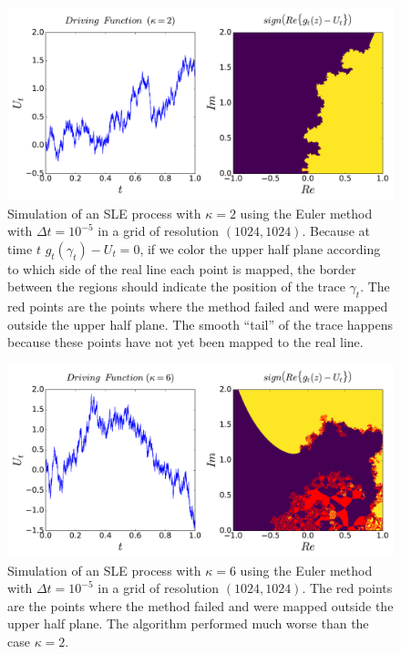 \begin{figure}
\begin{center}
    \includegraphics[scale=0.45]{chapters/ch4-sle/figs/euler1}
\end{center}
\caption{Simulation of an SLE process with $\kappa=2$ using the Euler method
    with $\Delta t = 10^{-5}$ in a grid of resolution $(1024, 1024)$. Because
    at time $t$ $g_t(\gamma_t)-U_t=0$, if we color the upper half plane
    according to which side of the real line each point is mapped, the border
    between the regions should indicate the position of the trace $\gamma_t$.
    The red points are the points where the method failed and were mapped
    outside the upper half plane. The smooth ``tail'' of the trace happens
    because these points have not yet been mapped to the real line.}
\label{fig:euler1}
\end{figure}

\begin{figure}
\begin{center}
    \includegraphics[scale=0.45]{chapters/ch4-sle/figs/euler2}
\end{center}
\caption{Simulation of an SLE process with $\kappa=6$ using the Euler method
    with $\Delta t = 10^{-5}$ in a grid of resolution $(1024, 1024)$. 
    The red points are the points where the method failed and were mapped
    outside the upper half plane. The algorithm performed much worse than
    the case $\kappa=2$.}
\label{fig:euler2}
\end{figure}


